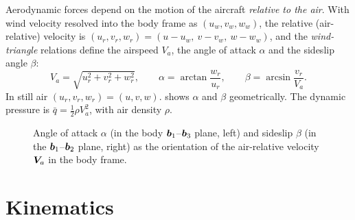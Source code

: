 Aerodynamic forces depend on the motion of the aircraft \emph{relative to the
air}. With wind velocity resolved into the body frame as $(u_w,v_w,w_w)$, the
relative (air-relative) velocity is $(u_r,v_r,w_r)=(u-u_w,\ v-v_w,\ w-w_w)$, and
the \emph{wind-triangle} relations define the airspeed $V_a$, the angle of attack
$\alpha$ and the sideslip angle $\beta$:
\begin{equation}
V_a=\sqrt{u_r^2+v_r^2+w_r^2},\qquad
\alpha=\arctan\!\frac{w_r}{u_r},\qquad
\beta=\arcsin\!\frac{v_r}{V_a}.
\label{eq:windtriangle}
\end{equation}
In still air $(u_r,v_r,w_r)=(u,v,w)$.  shows $\alpha$ and
$\beta$ geometrically. The dynamic pressure is $\bar q=\tfrac12\rho V_a^2$, with
air density $\rho$.

\begin{figure}[t]
\centering
{}
\caption{Angle of attack $\alpha$ (in the body $\bm{b}_1$--$\bm{b}_3$ plane,
left) and sideslip $\beta$ (in the $\bm{b}_1$--$\bm{b}_2$ plane, right) as the
orientation of the air-relative velocity $\bm{V}_a$ in the body frame.}
\label{fig:fw-angles}
\end{figure}

\section{Kinematics}

